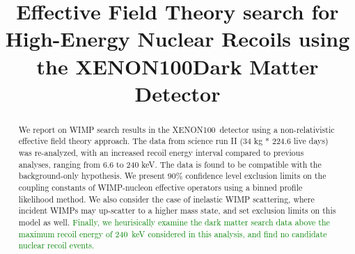 \documentclass[twocolumn, showpacs, showkeys, amsmath, amssymb, amsfonts, floatfix, linenumbers]{revtex4-1}
\newcommand{\Xehund}{{XENON100}}
\newcommand{\BenComment}[1]{\textcolor{green}{#1}}
\begin{document}

\title{Effective Field Theory search for High-Energy Nuclear Recoils using the \Xehund Dark Matter Detector}
%


\begin{abstract} 

We report on WIMP search results in the \Xehund\ detector using a non-relativistic effective field theory approach. The data from science run II (34 kg * 224.6 live days) was re-analyzed, with an increased recoil energy interval compared to previous analyses, ranging from 6.6 to 240 keV. The data is found to be compatible with the background-only hypothesis. We present 90\% confidence level exclusion limits on the coupling constants of WIMP-nucleon effective operators using a binned profile likelihood method. We also consider the case of inelastic WIMP scattering, where incident WIMPs may up-scatter to a higher mass state, and set exclusion limits on this model as well. \BenComment{Finally, we heurisically examine the dark matter search data above the maximum recoil energy of 240~keV considered in this analysis, and find no candidate nuclear recoil events.}
\end{abstract}

\pacs{}

\maketitle 













\appendix







%


\end{document}
